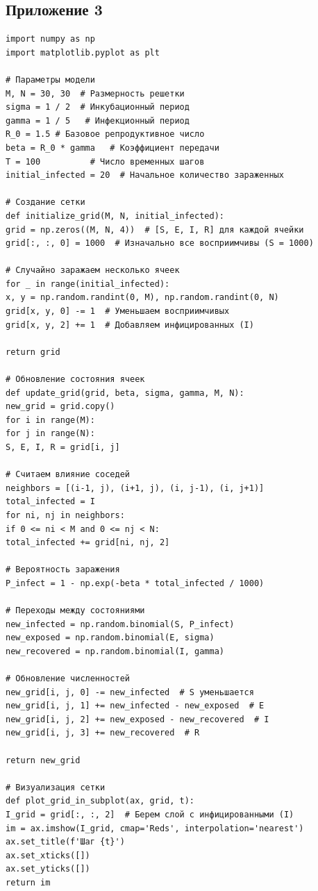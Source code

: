 \documentclass[a4paper, 14pt]{extreport}
\numberwithin{equation}{section}
\begin{document}
\subsection*{Приложение 3}
\begin{verbatim}
import numpy as np
import matplotlib.pyplot as plt

# Параметры модели
M, N = 30, 30  # Размерность решетки
sigma = 1 / 2  # Инкубационный период
gamma = 1 / 5   # Инфекционный период
R_0 = 1.5 # Базовое репродуктивное число 
beta = R_0 * gamma   # Коэффициент передачи
T = 100          # Число временных шагов
initial_infected = 20  # Начальное количество зараженных

# Создание сетки
def initialize_grid(M, N, initial_infected):
grid = np.zeros((M, N, 4))  # [S, E, I, R] для каждой ячейки
grid[:, :, 0] = 1000  # Изначально все восприимчивы (S = 1000)

# Случайно заражаем несколько ячеек
for _ in range(initial_infected):
x, y = np.random.randint(0, M), np.random.randint(0, N)
grid[x, y, 0] -= 1  # Уменьшаем восприимчивых
grid[x, y, 2] += 1  # Добавляем инфицированных (I)

return grid

# Обновление состояния ячеек
def update_grid(grid, beta, sigma, gamma, M, N):
new_grid = grid.copy()
for i in range(M):
for j in range(N):
S, E, I, R = grid[i, j]

# Считаем влияние соседей
neighbors = [(i-1, j), (i+1, j), (i, j-1), (i, j+1)]
total_infected = I
for ni, nj in neighbors:
if 0 <= ni < M and 0 <= nj < N:
total_infected += grid[ni, nj, 2]

# Вероятность заражения
P_infect = 1 - np.exp(-beta * total_infected / 1000)

# Переходы между состояниями
new_infected = np.random.binomial(S, P_infect)
new_exposed = np.random.binomial(E, sigma)
new_recovered = np.random.binomial(I, gamma)

# Обновление численностей
new_grid[i, j, 0] -= new_infected  # S уменьшается
new_grid[i, j, 1] += new_infected - new_exposed  # E
new_grid[i, j, 2] += new_exposed - new_recovered  # I
new_grid[i, j, 3] += new_recovered  # R

return new_grid

# Визуализация сетки
def plot_grid_in_subplot(ax, grid, t):
I_grid = grid[:, :, 2]  # Берем слой с инфицированными (I)
im = ax.imshow(I_grid, cmap='Reds', interpolation='nearest')
ax.set_title(f'Шаг {t}')
ax.set_xticks([])
ax.set_yticks([])
return im


\end{verbatim}
\end{document}
